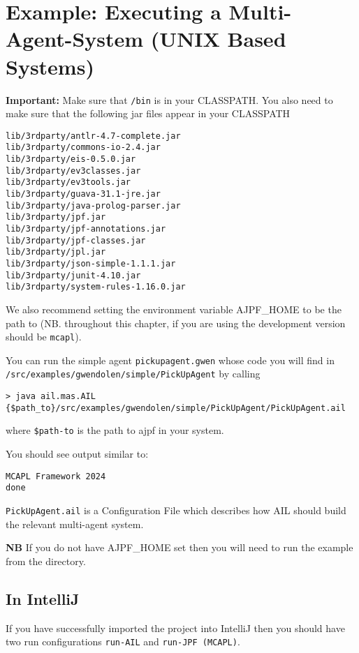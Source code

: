 \section{Example: Executing a Multi-Agent-System (UNIX Based Systems)}
{\bf Important:} Make sure that \texttt{\ajpfversion/bin} is in your CLASSPATH.  You also need to make sure that the following jar files appear in your CLASSPATH

\begin{verbatim}
lib/3rdparty/antlr-4.7-complete.jar
lib/3rdparty/commons-io-2.4.jar
lib/3rdparty/eis-0.5.0.jar
lib/3rdparty/ev3classes.jar
lib/3rdparty/ev3tools.jar
lib/3rdparty/guava-31.1-jre.jar
lib/3rdparty/java-prolog-parser.jar
lib/3rdparty/jpf.jar
lib/3rdparty/jpf-annotations.jar
lib/3rdparty/jpf-classes.jar
lib/3rdparty/jpl.jar
lib/3rdparty/json-simple-1.1.1.jar
lib/3rdparty/junit-4.10.jar
lib/3rdparty/system-rules-1.16.0.jar
\end{verbatim}

We also recommend setting the environment variable AJPF\_HOME to be the path to \texttt{\ajpfversion} (NB. throughout this chapter, if you are using the development version \texttt{\ajpfversion} should be \texttt{mcapl}).

You can run the simple agent \texttt{pickupagent.gwen} whose code you will find in \texttt{/src/examples/gwendolen/simple/PickUpAgent} by calling

\noindent \begin{lstlisting}[basicstyle=\tiny]
> java ail.mas.AIL {$path_to}/src/examples/gwendolen/simple/PickUpAgent/PickUpAgent.ail
\end{lstlisting}
\medskip

\noindent where \texttt{\${path-to}} is the path to ajpf in your system.

You should see output similar to:

\noindent \begin{lstlisting}
MCAPL Framework 2024
done
\end{lstlisting}
\medskip
 
\texttt{PickUpAgent.ail} is a Configuration File which describes how AIL should build the relevant multi-agent system.

{\bf NB}  If you do not have AJPF\_HOME set then you will need to run the example from the \texttt{\ajpfversion} directory.

\subsection{In IntelliJ}
If you have successfully imported the project into IntelliJ then you should have two run configurations \texttt{run-AIL} and \texttt{run-JPF (MCAPL)}.  

